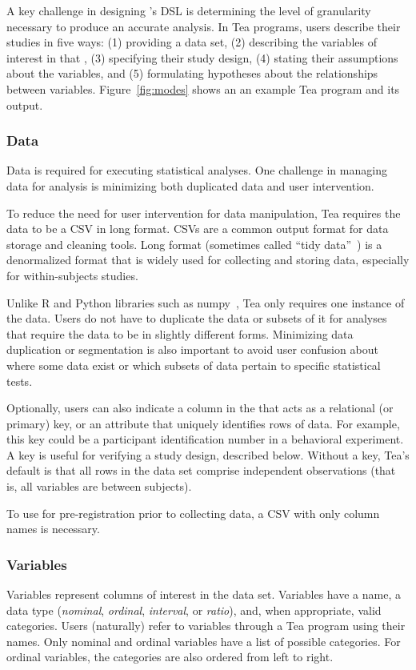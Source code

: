 A key challenge in designing \tea's DSL is determining the level of granularity
necessary to produce an accurate analysis.  In Tea programs, users describe
their studies in five ways: (1) providing a data set, (2) describing the
variables of interest in that \dataSet, (3) specifying their study design, (4)
stating their assumptions about the variables, and (5) formulating hypotheses
about the relationships between variables. Figure~\ref{fig:modes} shows an an
example Tea program and its output. 

\subsubsection{Data}
Data is required for executing statistical analyses. One challenge in managing
data for analysis is minimizing both duplicated data and user intervention.

To reduce the need for user intervention for data manipulation, Tea
requires the data to be a CSV in long format. CSVs are a common output
format for data storage and cleaning tools. Long format (sometimes
called ``tidy data''~\cite{wickham2014tidy}) is a denormalized format
that is widely used for collecting and storing data, especially for
within-subjects studies.

Unlike R and Python libraries such as numpy~\cite{oliphant2006numpy}, Tea only
requires one instance of the data. Users do not have to duplicate the data or
subsets of it for analyses that require the data to be in slightly different
forms. Minimizing data duplication or segmentation is also important to avoid
user confusion about where some data exist or which subsets of data pertain to
specific statistical tests.

Optionally, users can also indicate a column in the \dataSet that acts
as a relational (or primary) key, or an attribute that uniquely
identifies rows of data. For example, this key could be a participant
identification number in a behavioral experiment. A key is useful for
verifying a study design, described below. Without a key, Tea's default
is that all rows in the data set comprise independent observations (that is, all
variables are between subjects).

To use \tea for pre-registration prior to collecting data, a CSV with only
column names is necessary.

\subsubsection{Variables}
Variables represent columns of interest in the data set. Variables
have a name, a data type (\emph{nominal}, \emph{ordinal},
\emph{interval}, or \emph{ratio}), and, when appropriate, valid
categories.  Users (naturally) refer to variables through a Tea program using
their names. Only nominal and ordinal variables have a list of
possible categories. For ordinal variables, the categories are also
ordered from left to right.

